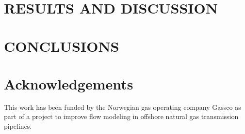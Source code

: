 \documentclass{mekit17}
\begin{document}
\section{RESULTS AND DISCUSSION}
\label{results}


\section{CONCLUSIONS}
\label{conclusion}


\section*{Acknowledgements}
This work has been funded by the Norwegian gas operating company Gassco as part of a project to improve flow modeling in offshore natural gas transmission pipelines. 

\printbibliography
\end{document}
